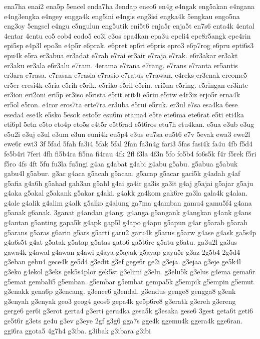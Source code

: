 ena7ha
enai2
ena5p
5encel
enda7ha
3endap
eneo6
en4g
e4ngak
eng5akan
e4ngana
e4ng3engka
e4ngey
engga4k
eng5ini
e4ngis
eng3isi
engka4k
5engkau
engo5na
eng3oy
5engsel
e4ngu
e5ngulun
eng5utik
eni5t6
enja5r
enja5t
en7s6
enta4k
4ental
4entar
4entu
eo5
eob4
eodo5
eo3i
e3os
epa4kan
epa3u
epeli4
epe8r5angk
epe4rin
epi5sp
e4p3l
epo3n
e4p5r
e6prak.
e6pret
ep6ri
e6pris
epro3
e6p7rog
e6pru
epti6s3
epu4k
e5ra
er3abua
er3adat
e7rah
e7rai
er3air
e7raja
e7rak.
e6r3akar
er3akt
er3aku
er3ala
e6r3alu
e7ram.
4erama
e7rana
e7rang.
e7rans
e7ranta
er5antis
er3ara
e7rasa.
e7rasan
e7rasia
e7rasio
e7ratus
e7rawan.
e4reks
er3enak
ereome5
er5er
eresi4k
e5ria
e5rih
e5rik.
e5riko
e5ril
e5rin.
eri5na
e5ring.
e5ringan
er3inte
er3ion
eri2oni
eri5p
er3iso
e5rista
e5rit
erit4i
e5riu
e5riw
e4r3iz
erjo5r
erna4k
er5ol
e5ron.
e4ror
eros7ta
erte7ra
er3uba
e5rui
e5ruk.
er3ul
e7sa
esa4ka
6ese
eseda4
ese4k
e5sko
5esok
esto5r
esu6m
etama4
e5te
ete6ma
ete6rat
e5ti
eti4ka
eti6pl
5etn
e5to
eto4p
eto5s
e4t5r
e5t6rad
e5t6ros
etu7h
etu4kan.
e5ua
e3ub
e3ug
e5u2i
e3uj
e3ul
e3um
e3un
euni4k
eu5p4
e3us
eu7sa
eu5t6
e7v
5evak
ewa3
ewe2l
ewe6r
ewi3
3f
5fad
5fah
fa3i4
5fak
5fal
2fan
fa3n4g
fari3
5fas
fasi4k
fa4u
4fb
f5d4
fe5b4ri
7feri
4fh
fi5b4ra
fi5na
fi4rau
4fk
2fl
f3la
4f3n
5fo
fo5b4
fo6s5k
f4r
f5rek
f5ri
f5ro
4fs
4ft
5fu
fu3la
fu5ngi
g4aa
g4abat
g4abi
g4abu
g5abu.
g5abua
g5abuk
gabu4l
g5abur.
g3ac
g4aca
g5acah
g5acan.
g5acap
g5acar
gaci5k
g4adah
g4af
g5afia
g4a6h
g5ahad
gah3an
g5ahl
g4ai
ga4ir
ga3is
ga3it
g4aj
g5ajai
g5ajar
g5aju
g4aka
g5akal
g5akank
g5akar
g4aki.
g4akk
ga4kom
gak6re
ga3la
gala4k
g4alan.
g4ale
g4alik
g4alim
g4alk
g5alko
g4alung
ga7ma
g4amban
gamu4
gamu5f4
g4ana
g5anak
g6anak.
3ganat
g4andan
g4ang.
g4anga
g5angank
g4angkan
g4ank
g4ans
g4antan
g5anting
gapa5k
g4apk
gap5l
g4apo
g4apu
g5apun
g4ar
g5arab
g5arah
g5arans
g5aras
g6arin
g5ars
g5arti
garu2
garu4k
g5arus
g5arw
g4ase
g4ask
ga5s4p
g4a6s5t
g4at
g5atak
g5atap
g5atas
gato6
ga5t6re
g5atu
g6atu.
ga3u2l
ga3us
gawa4k
g4awal
g4awan
g4awi
g4aya
g5ayak
g5ayap
gayu5r
g3az
2g5b4
2g5d4
g3eban
gebu4
gece4k
ge5d4
g3edit
g3ef
gege6r
ge2i
g3eja.
g3ejaa
g3eje
ge5k4l
g3eko
g4ekol
g3eks
gek5s4plor
gek5st
g3elimi
g3elu.
g3elu5k
g3elus
g4ema
gema6r
g5emat
gembali5
g5emban.
g5embar
g5embat
gempa5k
g5empik
g5empin
g5emut
g3enakk
gena6p
g3encang.
g3ence6
g3endal.
g3endus
genge8
gengga8
g3enk
g3enyah
g3enyak
geo3
geog4
geos6
gepa4k
ge5p6re8
g3eratk
g3ereh
g3ereng
gerge6
ger6i
g3erot
gerta4
g3erti
geru4ka
gesa5k
g3esaka
gese6
3gest
geta6t
geti6
ge5t6r
g3ets
ge4u
g3ev
g3eye
2gf
g3g6
gga7s
gge4k
ggemu4k
ggera4k
gge6ran.
ggi6ra
ggota5
4g7h4
g3iba.
g3ibak
g3ibara
g3ibi
